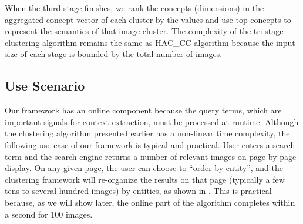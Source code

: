 When the third stage finishes, we rank the concepts (dimensions) in the aggregated 
concept vector of each cluster by the values and use top concepts to
represent the semantics of that image cluster.
The complexity of the tri-stage clustering algorithm remains the same as
HAC\_CC algorithm because the input size of each stage is bounded by
the total number of images.

\subsection{Use Scenario}
Our framework has an online component because the query terms, which are
important signals for context extraction, must be processed
at runtime. Although the clustering algorithm presented earlier has a
non-linear time complexity, the following use case of our framework is
typical and practical.
User enters a search term
and the search engine returns a number of relevant images on
page-by-page display. On any given page, the user can choose to
``order by entity'', and the clustering framework will re-organize
the results on that page (typically a few tens to several hundred images)
by entities, as shown in . This is practical
because, as we will show later, the online part of the algorithm completes
within a second for 100 images.



